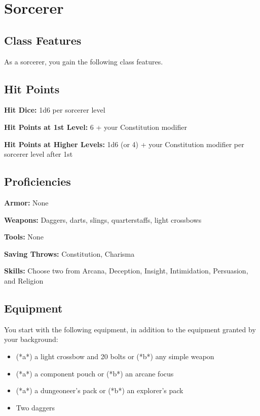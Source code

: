 \section{Sorcerer}

\subsection{Class Features}

As a sorcerer, you gain the following class features.

\subsection{Hit Points}

\textbf{Hit Dice:} 1d6 per sorcerer level

\textbf{Hit Points at 1st Level:} 6 + your Constitution modifier

\textbf{Hit Points at Higher Levels:} 1d6 (or 4) + your Constitution modifier per sorcerer level after 1st

\subsection{Proficiencies}

\textbf{Armor:} None

\textbf{Weapons:} Daggers, darts, slings, quarterstaffs, light crossbows

\textbf{Tools:} None

\textbf{Saving Throws:} Constitution, Charisma

\textbf{Skills:} Choose two from Arcana, Deception, Insight, Intimidation, Persuasion, and Religion

\subsection{Equipment}

You start with the following equipment, in addition to the equipment granted by your background:
\begin{itemize}
\item (*a*) a light crossbow and 20 bolts or (*b*) any simple weapon
\item (*a*) a component pouch or (*b*) an arcane focus
\item (*a*) a dungeoneer’s pack or (*b*) an explorer’s pack
\item Two daggers
\end{itemize}

